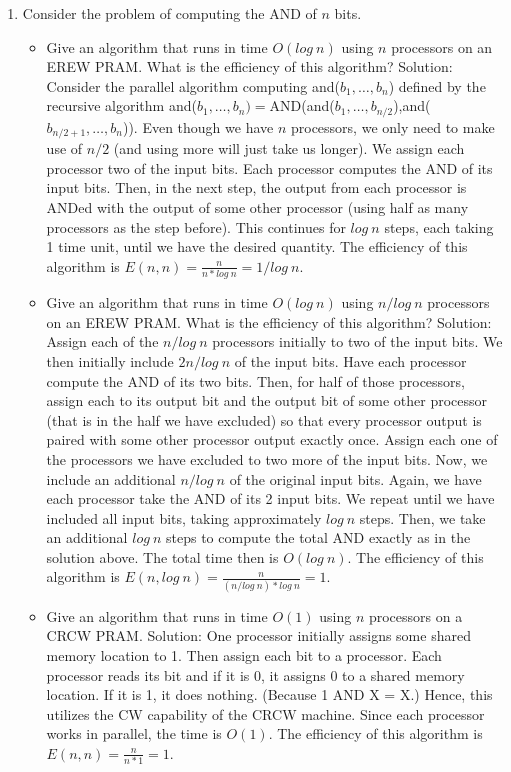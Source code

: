 \documentclass{article}
\begin{document}
\begin{enumerate}
\newline
\setcounter{enumi}{0}
\item Consider the problem of computing the AND of $n$ bits.
\begin{itemize}
\item Give an algorithm that runs in time $O(log\ n)$ using $n$ processors on an EREW PRAM. What is the efficiency of this algorithm?
\newline
\newline Solution: Consider the parallel algorithm computing and($b_1,\ldots, b_n$) defined by the recursive algorithm and($b_1,\ldots, b_n)=$AND(and($b_1,\ldots, b_{n/2}$),and($b_{n/2+1},\ldots, b_n$)). Even though we have $n$ processors, we only need to make use of $n/2$ (and using more will just take us longer). We assign each processor two of the input bits. Each processor computes the AND of its input bits. Then, in the next step, the output from each processor is ANDed with the output of some other processor (using half as many processors as the step before). This continues for $log\ n$ steps, each taking 1 time unit, until we have the desired quantity. The efficiency of this algorithm is $E(n,n)=\frac{n}{n*log\ n}=1/log\ n$.
\newline
\item Give an algorithm that runs in time $O(log\ n)$ using $n/log\ n$ processors on an EREW PRAM. What is the efficiency of this algorithm?
\newline
\newline Solution: Assign each of the $n/log\ n$ processors initially to two  of the input bits. We then initially include $2n/log\ n$ of the input bits. Have each processor compute the AND of its two bits. Then, for half of those processors, assign each to its output bit and the output bit of some other processor (that is in the half we have excluded) so that every processor output is paired with some other processor output exactly once. Assign each one of the processors we have excluded to two more of the input bits. Now, we include an additional $n/log\ n$ of the original input bits. Again, we have each processor take the AND of its 2 input bits. We repeat until we have included all input bits, taking approximately $log\ n$ steps. Then, we take an additional $log\ n$ steps to compute the total AND exactly as in the solution above. The total time then is $O(log\ n)$. The efficiency of this algorithm is $E(n,log\ n)=\frac{n}{(n/log\ n)*log\ n}=1$.
\newline
\item Give an algorithm that runs in time $O(1)$ using $n$ processors on a CRCW PRAM.
\newline
\newline Solution: One processor initially assigns some shared memory location to 1. Then assign each bit to a processor. Each processor reads its bit and if it is 0, it assigns 0 to a shared memory location. If it is 1, it does nothing. (Because 1 AND X = X.) Hence, this utilizes the CW capability of the CRCW machine. Since each processor works in parallel, the time is $O(1)$. The efficiency of this algorithm is $E(n,n)=\frac{n}{n*1}=1$.
\end{itemize}
\end{enumerate}
\end{document}
